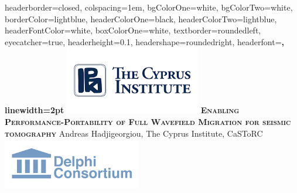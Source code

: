 \documentclass[landscape,a0paper,fontscale=0.285]{baposter} %
\begin{document}
\begin{poster}
{
headerborder=closed, %
colspacing=1em, %
bgColorOne=white, %
bgColorTwo=white, %
borderColor=lightblue, %
headerColorOne=black, %
headerColorTwo=lightblue, %
headerFontColor=white, %
boxColorOne=white, %
textborder=roundedleft, %
eyecatcher=true, %
headerheight=0.1\textheight, %
headershape=roundedright, %
headerfont=\Large\bf\textsc, %
linewidth=2pt %
}
%
{\includegraphics[height=8em]{cyi.png}} %
{\bf\textsc{\LARGE{Enabling Performance-Portability of Full Wavefield Migration \newline for seismic tomography}}\vspace{0.5em}} %
{ Andreas Hadjigeorgiou, \hspace{11pt} The Cyprus Institute, CaSToRC} %
{\includegraphics[height=6em]{delphi.png}} %


\end{poster}
\end{document}
